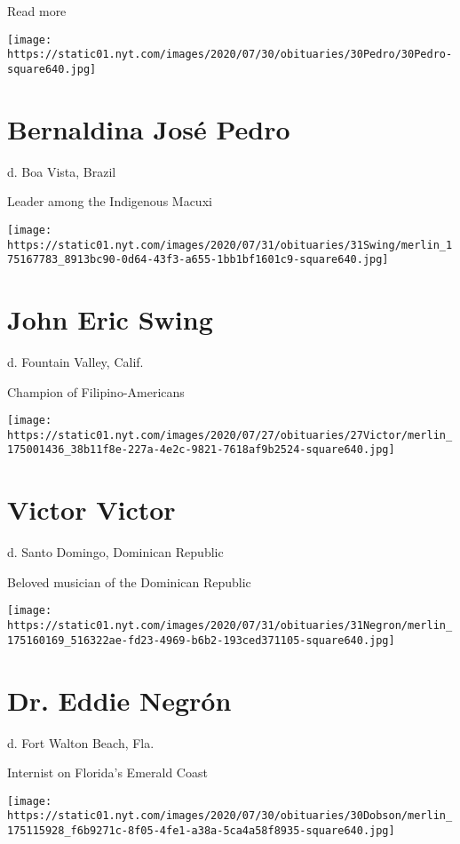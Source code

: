 Read more

\texttt{[image: https://static01.nyt.com/images/2020/07/30/obituaries/30Pedro/30Pedro-square640.jpg]}

\hypertarget{bernaldina-josuxe9-pedro}{%
\section{Bernaldina José Pedro}\label{bernaldina-josuxe9-pedro}}

d. Boa Vista, Brazil

Leader among the Indigenous Macuxi

\texttt{[image: https://static01.nyt.com/images/2020/07/31/obituaries/31Swing/merlin\_175167783\_8913bc90-0d64-43f3-a655-1bb1bf1601c9-square640.jpg]}

\hypertarget{john-eric-swing}{%
\section{John Eric Swing}\label{john-eric-swing}}

d. Fountain Valley, Calif.

Champion of Filipino-Americans

\texttt{[image: https://static01.nyt.com/images/2020/07/27/obituaries/27Victor/merlin\_175001436\_38b11f8e-227a-4e2c-9821-7618af9b2524-square640.jpg]}

\hypertarget{victor-victor}{%
\section{Victor Victor}\label{victor-victor}}

d. Santo Domingo, Dominican Republic

Beloved musician of the Dominican Republic

\texttt{[image: https://static01.nyt.com/images/2020/07/31/obituaries/31Negron/merlin\_175160169\_516322ae-fd23-4969-b6b2-193ced371105-square640.jpg]}

\hypertarget{dr-eddie-negruxf3n}{%
\section{Dr. Eddie Negrón}\label{dr-eddie-negruxf3n}}

d. Fort Walton Beach, Fla.

Internist on Florida's Emerald Coast

\texttt{[image: https://static01.nyt.com/images/2020/07/30/obituaries/30Dobson/merlin\_175115928\_f6b9271c-8f05-4fe1-a38a-5ca4a58f8935-square640.jpg]}

